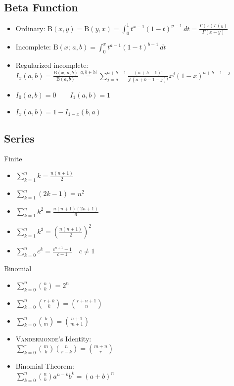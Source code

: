 \documentclass[landscape]{article}
\newenvironment{titemize}[1]{
  \begin{minipage}[h]{\columnwidth}
    #1
    \begin{itemize}
}{
    \end{itemize}
  \end{minipage}
}
\begin{document}
\begin{multicols*}{2}
\subsection{Beta Function}
\label{sec:math:beta}

\begin{itemize}
  \item Ordinary: $\text{B}(x,y) = \text{B}(y,x)
    = \displaystyle\int_0^1 t^{x-1}(1-t)^{y-1} \,dt
    = \displaystyle\frac{\Gamma(x)\Gamma(y)}{\Gamma(x+y)}$
\item Incomplete: $\text{B}(x;\,a,b)
    = \displaystyle\int_0^x t^{a-1}(1-t)^{b-1} \,dt$
  \item Regularized incomplete: \\
    $I_x(a,b) = \displaystyle\frac{\text{B}(x;\,a,b)}{\text{B}(a,b)}
      \stackrel{a,b\in\mathbb N}{=}
      \sum_{j=a}^{a+b-1} \frac{(a+b-1)!}{j!(a+b-1-j)!}x^j(1-x)^{a+b-1-j}$
  \item $I_0(a,b) = 0 \qquad I_1(a,b) = 1$
  \item $I_x(a,b) = 1 - I_{1-x}(b,a)$
\end{itemize}

\subsection{Series}

\begin{multicols}{2}
  \begin{titemize}{Finite}
  \item $\displaystyle\sum_{k=1}^n k = \frac{n(n+1)}{2}$
  \item $\displaystyle\sum_{k=1}^n (2k-1) = n^2$
  \item $\displaystyle\sum_{k=1}^n k^2 = \frac{n(n+1)(2n+1)}{6}$
  \item $\displaystyle\sum_{k=1}^n k^3 = \left(\frac{n(n+1)}{2}\right)^2$
  \item $\displaystyle\sum_{k=0}^n c^k = \frac{c^{n+1}-1}{c-1} \quad c\neq1$
\end{titemize}

\begin{titemize}{Binomial}
  \item $\displaystyle\sum_{k=0}^n \binom{n}{k} = 2^n$
  \item $\displaystyle\sum_{k=0}^n \binom{r+k}{k}=\binom{r+n+1}{n}$
  \item $\displaystyle\sum_{k=0}^n \binom{k}{m}=\binom{n+1}{m+1}$
  \item \textsc{Vandermonde}'s Identity:\\
    $\displaystyle\sum_{k=0}^r \binom{m}{k}\binom{n}{r-k}=\binom{m+n}{r}$
  \item Binomial Theorem:\\
    $\displaystyle\sum_{k=0}^n \binom{n}{k}a^{n-k}b^k = (a+b)^n$
\end{titemize}
\end{multicols}


\end{multicols*}
\end{document}
